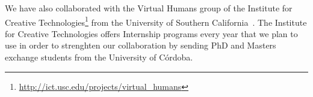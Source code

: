 We have also collaborated with the Virtual Humans group of the Institute for
Creative Technologies\footnote{\url{http://ict.usc.edu/projects/virtual_humans}}
from the University of Southern California~\cite{benotti09a}. The Institute for
Creative Technologies offers Internship programs every year that we plan to use
in order to strenghten our collaboration by sending PhD and Masters exchange
students from the University of C\'ordoba.


